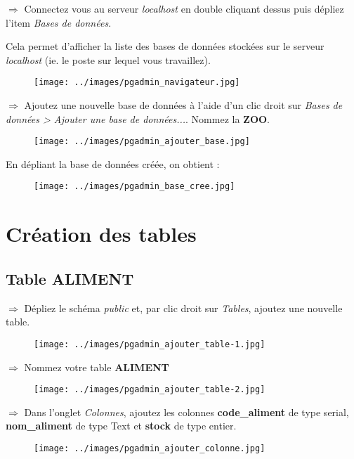 \documentclass[11pt]{article}
\begin{document}
		$\Rightarrow$ Connectez vous au serveur \textit{localhost} en double cliquant dessus puis dépliez l'item \textit{Bases de données}. 
		
		Cela permet d'afficher la liste des bases de données stockées sur le serveur \textit{localhost} (ie. le poste sur lequel vous travaillez).
		\begin{figure}[H]
			\center \texttt{[image: ../images/pgadmin\_navigateur.jpg]}\\[1em]
		\end{figure}
		
		$\Rightarrow$ Ajoutez une nouvelle base de données à l'aide d'un clic droit sur \textit{Bases de données > Ajouter une base de données...}. Nommez la \textbf{ZOO}.
		\begin{figure}[H]
			\center \texttt{[image: ../images/pgadmin\_ajouter\_base.jpg]}\\[1em]
		\end{figure}
		
		En dépliant la base de données créée, on obtient :
		\begin{figure}[H]
			\center \texttt{[image: ../images/pgadmin\_base\_cree.jpg]}\\[1em]
		\end{figure}
	
	
	\section{Création des tables}
		\subsection{Table ALIMENT}
			$\Rightarrow$ Dépliez le schéma \textit{public} et, par clic droit sur \textit{Tables}, ajoutez une nouvelle table.
			\begin{figure}[H]
				\center \texttt{[image: ../images/pgadmin\_ajouter\_table-1.jpg]}\\[1em]
			\end{figure}
			
			$\Rightarrow$ Nommez votre table \textbf{ALIMENT}
			\begin{figure}[H]
				\center \texttt{[image: ../images/pgadmin\_ajouter\_table-2.jpg]}\\[1em]
			\end{figure}
			
			$\Rightarrow$ Dans l'onglet \textit{Colonnes}, ajoutez les colonnes \textbf{code\_aliment} de type serial, \textbf{nom\_aliment} de type Text et \textbf{stock} de type entier.
			\begin{figure}[H]
				\center \texttt{[image: ../images/pgadmin\_ajouter\_colonne.jpg]}\\[1em]
			\end{figure}
			
\end{document}
